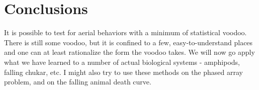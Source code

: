 \section{Conclusions}
It is possible to test for aerial behaviors with a minimum of statistical voodoo.  There is still some voodoo, but it is confined to a few, easy-to-understand places and one can at least rationalize the form the voodoo takes. We will now go apply what we have learned to a number of actual biological systems - amphipods, falling chukar, etc.  I might also try to use these methods on the phased array problem, and on the falling animal death curve.



